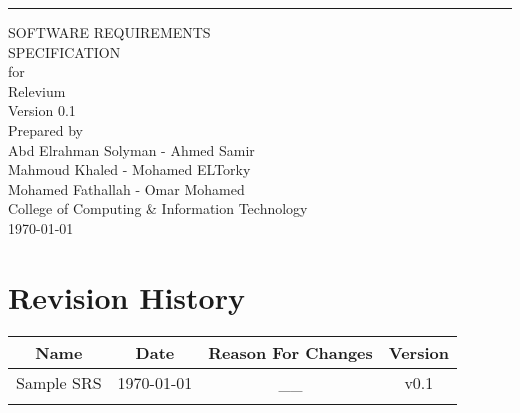 \documentclass{scrreprt}
\date{\today}
\def\myversion{0.1}
\begin{document}
\begin{flushright}
    \rule{16cm}{5pt}\vskip1cm
    \begin{bfseries}
        \Huge{SOFTWARE REQUIREMENTS\\ SPECIFICATION}\\
        \vspace{1cm}
        for\\
        \vspace{1cm}
        Relevium\\
        \vspace{1cm}
        \LARGE{Version \myversion}\\
        \vspace{1cm}
        Prepared by\\
        Abd Elrahman Solyman - 
        Ahmed Samir \\
        Mahmoud Khaled -
        Mohamed ELTorky \\ 
        Mohamed Fathallah -
        Omar Mohamed\\

        \vspace{1.9cm}
        College of Computing \& Information Technology\\
        \vspace{1.9cm}
        \today\\
    \end{bfseries}
\end{flushright}

\tableofcontents


\chapter*{Revision History}

\begin{center}
    \begin{tabular}{|c|c|c|c|}
        \hline
	    Name & Date & Reason For Changes & Version\\
        \hline
	   Sample SRS & \today & __ & v0.1\\
        \hline
	   & & & \\
        \hline
    \end{tabular}
\end{center}
\end{document}
